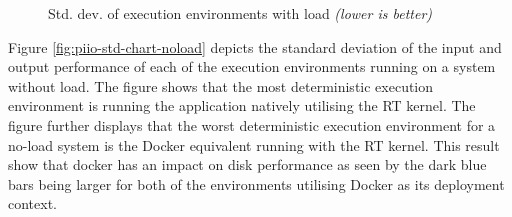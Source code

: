 \mydataload
\begin{figure}[ht]
\caption{Std. dev. of execution environments with load \textit{(lower is better)}}
\label{fig:piio-std-chart-load}
\end{figure}


Figure \ref{fig:piio-std-chart-noload} depicts the standard deviation of the input and output performance of each of the execution environments running on a system without load. The figure shows that the most deterministic execution environment is running the application natively utilising the RT kernel. The figure further displays that the worst deterministic execution environment for a no-load system is the Docker equivalent running with the RT kernel. This result show that docker has an impact on disk performance as seen by the dark blue bars being larger for both of the environments utilising Docker as its deployment context.

